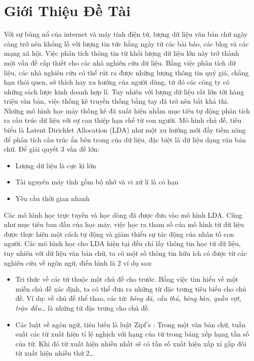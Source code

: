 \documentclass[fontsize=13pt]{scrartcl}
\begin{document}
\section{Giới Thiệu Đề Tài}
Với sự bùng nổ của internet và máy tính điện tử, lượng dữ liệu văn bản chữ ngày càng trở nên khổng lồ với lượng tin tức hằng ngày từ các bài báo, các blog và các mạng xã hội. Việc phân tích thông tin từ khối lượng dữ liệu lớn này trở thành một vấn đề cấp thiết cho các nhà nghiên cứu dữ liệu. Bằng việc phân tích dữ liệu, các nhà nghiên cứu có thể rút ra được những lượng thông tin quý giá, chẳng hạn thói quen, sở thích hay xu hướng của người dùng, từ đó các công ty có những sách lược kinh doanh hợp lí. Tuy nhiên với lượng dữ liệu rất lớn tới hàng triệu văn bản, việc thống kê truyền thống bằng tay đã trở nên bất khả thi. Những mô hình học máy thống kê đã xuất hiện nhằm mục tiêu tự động phân tích ra cấu trúc dữ liệu với sự can thiệp hạn chế từ con người. Mô hình chủ đề, tiêu biểu là Latent Dirichlet Allocation (LDA) như một xu hướng mới đầy tiềm năng để phân tích cấu trúc ẩn bên trong của dữ liệu, đặc biệt là dữ liệu dạng văn bản chữ. Để giải quyết 3 vấn đề lớn:
\begin{itemize}
\item Lượng dữ liệu là cực kì lớn
\item Tài nguyên máy tính gồm bộ nhớ và vi xử lí là có hạn
\item Yêu cầu thời gian nhanh
\end{itemize} 
\par 
Các mô hình học trực tuyến và học dòng đã được đưa vào mô hình LDA. Cũng như mục tiêu ban đầu của học máy, việc học ra tham số của mô hình từ dữ liệu được thực hiện một cách tự động và giảm thiểu sự tác động của nhân tố con người. Các mô hình học cho LDA hiện tại đều chỉ lấy thông tin học từ dữ liệu, tuy nhiên với dữ liệu văn bản chữ, ta có một số thông tin hữu ích có được từ các nghiên cứu về ngôn ngữ, điển hình là 2 ví dụ sau:
\begin{itemize}
\item Tri thức về các từ thuộc một chủ đề cho trước. Bằng việc tìm hiểu về một miền chủ đề xác định, ta có thể đưa ra những từ đặc trưng tiêu biểu cho chủ đề. Ví dụ: về chủ đề thể thao, các từ: \textit{bóng đá, cầu thủ, bóng bàn, quần vợt, trận đấu…} là những từ đặc trưng cho chủ đề.
\item Các luật về ngôn ngữ, tiêu biểu là luật Zipf’s : Trong một văn bản chữ, tuần suất các từ xuất hiện tỉ lệ nghịch với hạng của từ trong bảng xếp hạng tần số của từ. Khi đó từ xuất hiện nhiều nhất sẽ có tần số xuất hiện xấp xỉ gấp đôi từ xuất hiện nhiều thứ 2…
\end{itemize}
\end{document}
